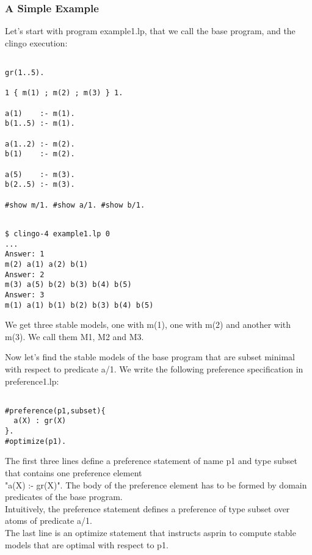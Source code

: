 

\subsubsection{A Simple Example}

 Let's start with program  example1.lp, that we call the base program,  and the  clingo  execution: 
\begin{verbatim}

gr(1..5).

1 { m(1) ; m(2) ; m(3) } 1.   

a(1)    :- m(1).
b(1..5) :- m(1).

a(1..2) :- m(2).
b(1)    :- m(2).

a(5)    :- m(3).
b(2..5) :- m(3). 

#show m/1. #show a/1. #show b/1.
\end{verbatim}
\begin{verbatim}

$ clingo-4 example1.lp 0
...
Answer: 1
m(2) a(1) a(2) b(1) 
Answer: 2
m(3) a(5) b(2) b(3) b(4) b(5) 
Answer: 3
m(1) a(1) b(1) b(2) b(3) b(4) b(5)

\end{verbatim}

 We get three stable models, one with m(1), one with m(2) and another with m(3). We call them M1, M2 and M3. 

 Now let's find the stable models of the base program that are subset minimal with respect to predicate a/1. 
 We write the following preference specification in preference1.lp: 
\begin{verbatim}

#preference(p1,subset){                                                                                             
  a(X) : gr(X)                                                                                                    
}.
#optimize(p1).
\end{verbatim}

 The first three lines define a preference statement of name p1 and type subset that contains one preference element 
\\ "a(X) :- gr(X)". The body of the preference element has to be formed by domain predicates of the base program.
\\ Intuitively, the preference statement defines a preference of type subset over atoms of predicate a/1. 
\\ The last line is an optimize statement that instructs asprin to compute stable models that are optimal with respect to p1. 

